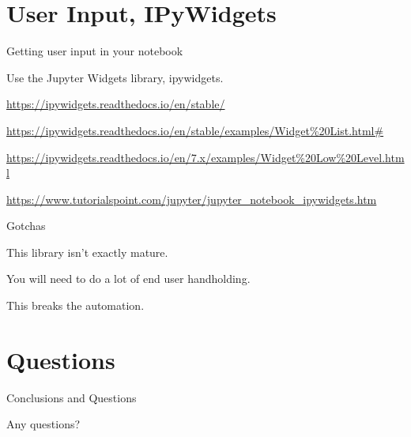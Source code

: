 \documentclass{beamer}
\begin{document}
\section{User Input, IPyWidgets}



\begin{frame}
    \LARGE Getting user input in your notebook

    \normalsize
    Use the Jupyter Widgets library, ipywidgets.

    \url{https://ipywidgets.readthedocs.io/en/stable/ }

    \url{https://ipywidgets.readthedocs.io/en/stable/examples/Widget\%20List.html\# }

    \url{https://ipywidgets.readthedocs.io/en/7.x/examples/Widget\%20Low\%20Level.html }

    \url{https://www.tutorialspoint.com/jupyter/jupyter\_notebook\_ipywidgets.htm }
    
\end{frame}

\begin{frame}
    \LARGE Gotchas

    \normalsize
    This library isn't exactly mature.

    You will need to do a lot of end user handholding.

    This breaks the automation.

    
\end{frame}


\section{Questions}

\begin{frame}
    \LARGE Conclusions and Questions

    \normalsize
    Any questions?
\end{frame}
\end{document}

